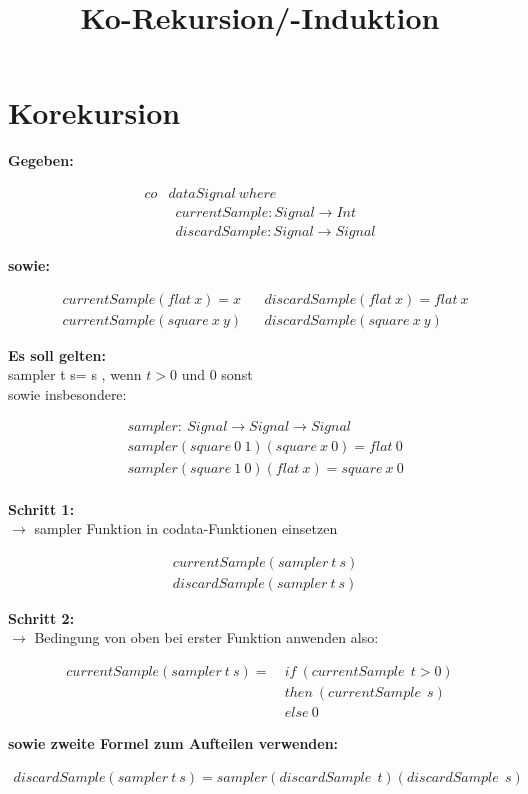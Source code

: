 \documentclass{article}
\title{Ko-Rekursion/-Induktion}
\date{ }
\begin{document}
	\section{Korekursion}
	\textbf{Gegeben:}
		\begin{fleqn}
				\begin{align*}
					co&data Signal\:where  \\
					& \enspace currentSample : Signal \rightarrow Int \\
					& \enspace discardSample : Signal \rightarrow Signal
				\end{align*}
		\end{fleqn}
	\textbf{sowie:}
	\begin{fleqn}
	\begin{align*}
		&currentSample(flat\:x) = x			&
		&discardSample(flat\:x) = flat\:x	\\
		&currentSample(square\:x\:y)		&
		&discardSample(square\:x\:y)		
	\end{align*}	
	\end{fleqn}
	\textbf{Es soll gelten:}\\
	sampler t s\enspace = s , wenn $t>0$ und 0 sonst\\
	sowie insbesondere:
	\begin{fleqn}
	\begin{align*}
		&sampler:\:Signal\rightarrow Signal\rightarrow Signal \\
		&sampler(square\:0\:1)(square\:x\:0) = flat\:0 \\
		&sampler(square\:1\:0)(flat\:x) = square\:x\:0  \\
	\end{align*}	
	\end{fleqn}
	\textbf{Schritt 1:}\\
	$\rightarrow$ sampler Funktion in codata-Funktionen einsetzen
	\begin{fleqn}
	\begin{align*}
		&currentSample(sampler\:t\:s)\\
		&discardSample(sampler\:t\:s)	
	\end{align*}	
	\end{fleqn}
	\textbf{Schritt 2:}\\
	$\rightarrow$ Bedingung von oben bei erster Funktion anwenden also:
	\begin{fleqn}
		\begin{align*}
			currentSample(sampler\:t\:s) = \:&if\:(currentSample\:\:t>0)\\
											&then\:(currentSample\:\:s)\\
											&else\:0
		\end{align*}
	\end{fleqn}
	\textbf{sowie zweite Formel zum Aufteilen verwenden:}
		\begin{fleqn}
		\begin{align*}
			discardSample(sampler\:t\:s) = sampler(discardSample\:\:t)(discardSample\:\:s)
		\end{align*}
	\end{fleqn}
	\newpage
\end{document}
